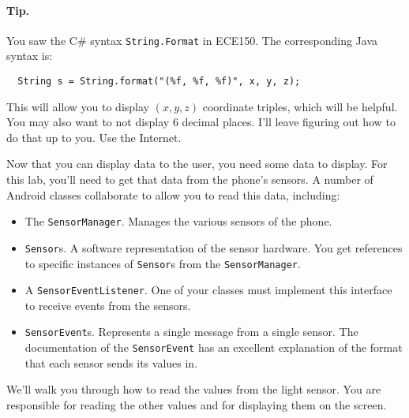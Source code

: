 \documentclass[10pt]{article}
\begin{document}
\paragraph{Tip.} You saw the C\# syntax {\tt String.Format} in ECE150. The corresponding Java syntax is:
\begin{verbatim}
  String s = String.format("(%f, %f, %f)", x, y, z);
\end{verbatim}
This will allow you to display $(x, y, z)$ coordinate triples, which will be helpful. You may also want to not display 6 decimal places. I'll leave figuring out how to do that up to you. Use the Internet.



Now that you can display data to the user, you need some data to display. For this lab, you'll need to get that data from the phone's sensors. A number of Android classes collaborate to allow you to read this data, including:

\begin{itemize}
\item The {\tt SensorManager}. Manages the various sensors of the phone.
\item {\tt Sensor}s. A software representation of the sensor hardware. You get references to specific instances of {\tt Sensor}s from the {\tt SensorManager}.
\item A {\tt SensorEventListener}. One of your classes must implement this interface to receive events from the sensors.
\item {\tt SensorEvent}s. Represents a single message from a single sensor. The documentation of the {\tt SensorEvent} has an excellent explanation of the format that each sensor sends its values in.
\end{itemize}

We'll walk you through how to read the values from the light sensor. You are responsible
for reading the other values and for displaying them on the screen.
\end{document}
